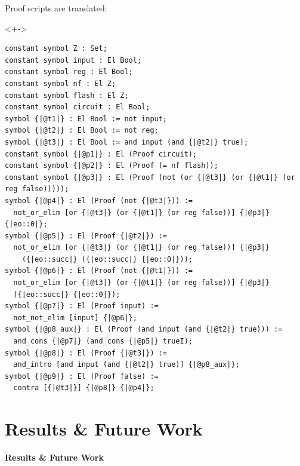 \documentclass[handout, lualatex, compress, 12pt-------------------------------------------------------------------------------------------------------------]{beamer}
\begin{document}
\begin{frame}[fragile]
	Proof scripts are translated:\\[2mm]
	\begin{uncoverenv}<+->%
		\exxample
		\begin{lstlisting}[basicstyle=\ttfamily\tiny]
constant symbol Z : Set;
constant symbol input : El Bool;
constant symbol reg : El Bool;
constant symbol nf : El Z;
constant symbol flash : El Z;
constant symbol circuit : El Bool;
symbol {|@t1|} : El Bool := not input;
symbol {|@t2|} : El Bool := not reg;
symbol {|@t3|} : El Bool := and input (and {|@t2|} true);
constant symbol {|@p1|} : El (Proof circuit);
constant symbol {|@p2|} : El (Proof (= nf flash));
constant symbol {|@p3|} : El (Proof (not (or {|@t3|} (or {|@t1|} (or reg false)))));
symbol {|@p4|} : El (Proof (not {|@t3|})) :=
  not_or_elim [or {|@t3|} (or {|@t1|} (or reg false))] {|@p3|} {|eo::0|};
symbol {|@p5|} : El (Proof {|@t2|}) :=
  not_or_elim [or {|@t3|} (or {|@t1|} (or reg false))] {|@p3|}
    ({|eo::succ|} ({|eo::succ|} {|eo::0|}));
symbol {|@p6|} : El (Proof (not {|@t1|})) :=
  not_or_elim [or {|@t3|} (or {|@t1|} (or reg false))] {|@p3|}
  ({|eo::succ|} {|eo::0|});
symbol {|@p7|} : El (Proof input) :=
  not_not_elim [input] {|@p6|};
symbol {|@p8_aux|} : El (Proof (and input (and {|@t2|} true))) :=
  and_cons {|@p7|} (and_cons {|@p5|} trueI);
symbol {|@p8|} : El (Proof {|@t3|}) :=
  and_intro [and input (and {|@t2|} true)] {|@p8_aux|};
symbol {|@p9|} : El (Proof false) :=
  contra [{|@t3|}] {|@p8|} {|@p4|};\end{lstlisting}
	\end{uncoverenv}
\end{frame}

\section{Results \& Future Work}


\begin{frame}[standout]
	\centering\Huge
	\textbf{Results \& Future Work}
\end{frame}
\end{document}
